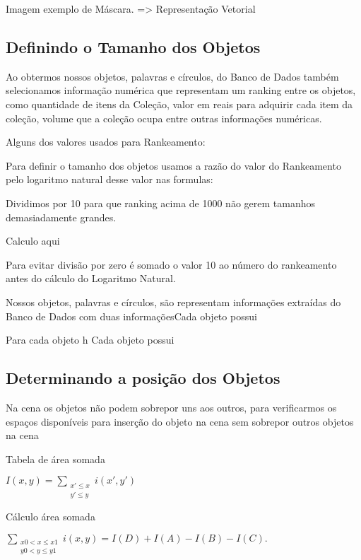 \documentclass[12pt]{article}
\begin{document}
Imagem exemplo de Máscara. => Representação Vetorial


\subsection{Definindo o Tamanho dos Objetos}

Ao obtermos nossos objetos, palavras e círculos, do Banco de Dados também selecionamos informação numérica que representam um ranking entre os objetos, como quantidade de itens da Coleção, valor em reais para adquirir cada item da coleção, volume que a coleção ocupa entre outras informações numéricas.

Alguns dos valores usados para Rankeamento:


Para definir o tamanho dos objetos usamos a razão do valor do Rankeamento pelo logaritmo natural desse valor nas formulas:

Dividimos por 10 para que ranking acima de 1000 não gerem tamanhos demasiadamente grandes. 

{Calculo aqui}

Para evitar divisão por zero é somado o valor 10 ao número do rankeamento antes do cálculo do Logaritmo Natural.

 


Nossos objetos, palavras e círculos, são representam informações extraídas do Banco de Dados com duas informaçõesCada objeto possui 


Para cada objeto h
Cada objeto possui



\subsection{Determinando a posição dos Objetos}

Na cena os objetos não podem sobrepor uns aos outros, para verificarmos os espaços disponíveis para inserção do objeto na cena sem sobrepor outros objetos na cena 


Tabela de área somada

$I(x,y) = \sum_{\begin{smallmatrix} x' \le x \\ y' \le y\end{smallmatrix}} i(x',y')$

Cálculo área somada


$\sum_{\begin{smallmatrix} x0 < x \le x1 \\ y0 < y \le y1 \end{smallmatrix}} i(x,y) = I(D) + I(A) - I(B) - I(C).$
\end{document}
